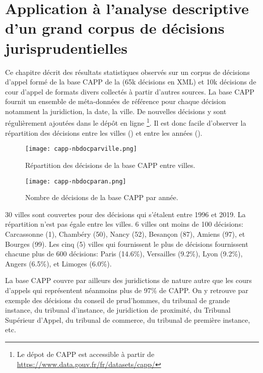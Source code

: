 \chapter[Application à l'analyse descriptive d'un grand corpus]{Application à l'analyse descriptive d'un grand corpus de décisions jurisprudentielles}
\label{chap:demo}
Ce chapitre décrit des résultats statistiques observés sur un corpus de décisions d'appel formé de la base CAPP de la \citet{dila2019capp} (65k décisions en XML) et 10k décisions de cour d'appel de formats divers collectés à partir d'autres sources. La base CAPP fournit un ensemble de méta-données de référence pour chaque décision notamment la juridiction, la date, la ville. De nouvelles décisions y sont régulièrement ajoutées dans le dépôt en ligne \footnote{Le dépot de CAPP est accessible à partir de \url{https://www.data.gouv.fr/fr/datasets/capp/}}. Il est donc facile d'observer la répartition des décisions entre les villes () et entre les années ().

\begin{figure}[!htb]
	\centering
	\centering
	\texttt{[image: capp-nbdocparville.png]}
	\caption{Répartition des décisions de la base CAPP entre villes.} \label{fig:demo:doc-per-city}
\end{figure}

\begin{figure}[!htb]
	\centering
	\texttt{[image: capp-nbdocparan.png]}
	\caption{Nombre de décisions de la base CAPP par année.} \label{fig:demo:doc-per-year}
\end{figure}

 30 villes sont couvertes pour des décisions qui s'étalent entre 1996 et 2019. La répartition n'est pas égale entre les villes.  6 villes ont moins de 100 décisions: Carcassonne (1), Chambéry (50), Nancy (52), Besançon (87), Amiens (97), et Bourges (99). Les cinq (5) villes qui fournissent le plus de décisions fournissent chacune plus de 600 décisions: Paris (14.6\%), Versailles (9.2\%), Lyon (9.2\%), Angers (6.5\%), et Limoges (6.0\%).



La base CAPP couvre par ailleurs des juridictions de nature autre que les cours d'appels qui représentent néanmoins plus de 97\% de CAPP. On y retrouve par exemple des décisions du conseil de prud'hommes, du tribunal de grande instance, du tribunal d'instance, de juridiction de proximité, du Tribunal Supérieur d'Appel, du tribunal de commerce, du tribunal de première instance, etc.


